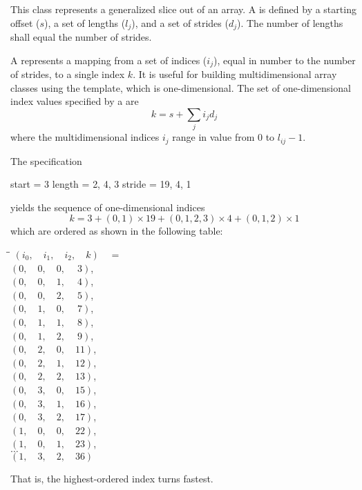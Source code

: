 \pnum
This class represents a generalized slice out of an array.
A
is defined by a starting offset ($s$),
a set of lengths ($l_j$),
and a set of strides ($d_j$).
The number of lengths shall equal the number of strides.

\pnum
A
represents a mapping from a set of indices ($i_j$),
equal in number to the number of strides, to a single index $k$.
It is useful for building multidimensional array classes using
the
template, which is one-dimensional.
The set of one-dimensional index values specified by a  are
\[ k = s + \sum_j i_j d_j \]
where the multidimensional indices $i_j$ range in value from
0 to $l_{ij} - 1$.

\pnum
\begin{example}
The
specification
\begin{codeblock}
start  = 3
length = {2, 4, 3}
stride = {19, 4, 1}
\end{codeblock}
yields the sequence of one-dimensional indices
\[ k = 3 + (0, 1) \times 19 + (0, 1, 2, 3) \times 4 + (0, 1, 2) \times 1 \]
which are ordered as shown in the following table:

\begin{tabbing}
\hspace{.5in}\=\hspace{.4in}\=\kill%
\>$(i_0,\quad i_1,\quad i_2,\quad k)\quad =$\\
\>\>$(0,\quad 0,\quad 0,\quad \ 3)$,    \\
\>\>$(0,\quad 0,\quad 1,\quad \ 4)$,    \\
\>\>$(0,\quad 0,\quad 2,\quad \ 5)$,    \\
\>\>$(0,\quad 1,\quad 0,\quad \ 7)$,    \\
\>\>$(0,\quad 1,\quad 1,\quad \ 8)$,    \\
\>\>$(0,\quad 1,\quad 2,\quad \ 9)$,    \\
\>\>$(0,\quad 2,\quad 0,\quad 11)$, \\
\>\>$(0,\quad 2,\quad 1,\quad 12)$, \\
\>\>$(0,\quad 2,\quad 2,\quad 13)$, \\
\>\>$(0,\quad 3,\quad 0,\quad 15)$, \\
\>\>$(0,\quad 3,\quad 1,\quad 16)$, \\
\>\>$(0,\quad 3,\quad 2,\quad 17)$, \\
\>\>$(1,\quad 0,\quad 0,\quad 22)$, \\
\>\>$(1,\quad 0,\quad 1,\quad 23)$, \\
\>\>$\ldots$      \\
\>\>$(1,\quad 3,\quad 2,\quad 36)$
\end{tabbing}

That is, the highest-ordered index turns fastest.
\end{example}

